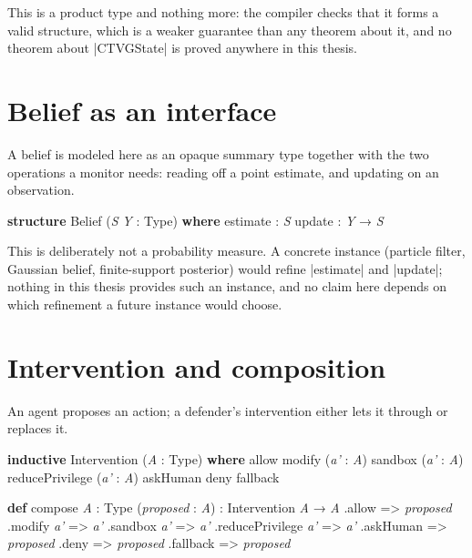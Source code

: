 \documentclass{memoir}
\begin{document}
This is a product type and nothing more: the compiler checks that it forms
a valid structure, which is a weaker guarantee than any theorem about it,
and no theorem about \LeanVerb|CTVGState| is proved anywhere in this thesis.



\section{Belief as an interface}\label{Capability--Monotonicity--in--a--Formal--Skeleton--for--Agentic--AI--Safety----The--Formal--Model----Belief--as--an--interface}

A belief is modeled here as an opaque summary type together with the two
operations a monitor needs: reading off a point estimate, and updating on
an observation.

\begin{LeanVerbatim}
\textbf{structure} Belief (\textit{S} \textit{Y} : Type) \textbf{where}
  estimate : \textit{S}
  update   : \textit{Y} → \textit{S}

\end{LeanVerbatim}


This is deliberately not a probability measure. A concrete instance
(particle filter, Gaussian belief, finite-support posterior) would refine
\LeanVerb|estimate| and \LeanVerb|update|; nothing in this thesis provides such an instance,
and no claim here depends on which refinement a future instance would
choose.



\section{Intervention and composition}\label{Capability--Monotonicity--in--a--Formal--Skeleton--for--Agentic--AI--Safety----The--Formal--Model----Intervention--and--composition}

An agent proposes an action; a defender's intervention either lets it
through or replaces it.

\begin{LeanVerbatim}
\textbf{inductive} Intervention (\textit{A} : Type) \textbf{where}
   allow
   modify (\textit{a'} : \textit{A})
   sandbox (\textit{a'} : \textit{A})
   reducePrivilege (\textit{a'} : \textit{A})
   askHuman
   deny
   fallback

\textbf{def} compose \textit{A} : Type (\textit{proposed} : \textit{A}) : Intervention \textit{A} → \textit{A}
   .allow              => \textit{proposed}
   .modify \textit{a'}          => \textit{a'}
   .sandbox \textit{a'}         => \textit{a'}
   .reducePrivilege \textit{a'} => \textit{a'}
   .askHuman           => \textit{proposed}
   .deny               => \textit{proposed}
   .fallback           => \textit{proposed}

\end{LeanVerbatim}
\end{document}
